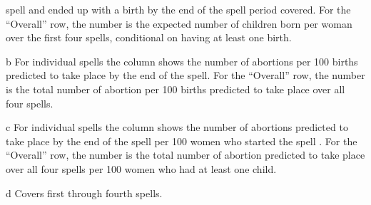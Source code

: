 \documentclass[12pt,letterpaper]{article}
\begin{document}
\begin{table}[htbp]
\begin{center}
\begin{scriptsize}
\begin{threeparttable}
\begin{tablenotes}
spell and ended up with a birth by the end of the spell period covered.
For the ``Overall'' row, the number is the expected number of children born per woman over 
the first four spells, conditional on having at least one birth.
\item[b] For individual spells the column shows the number of abortions per 100
births predicted to take place by the end of the spell.
For the ``Overall'' row, the number is the total number of abortion per 100 births 
predicted to take place over all four spells.
\item[c]  For individual spells the column shows the number of abortions 
predicted to take place by the end of the spell per 100 women who started the spell .
For the ``Overall'' row, the number is the total number of abortion 
predicted to take place over all four spells per 100 women who had at least one child.
\item[d] Covers first through fourth spells. 
\end{tablenotes}
\end{threeparttable}
\end{scriptsize}
\end{center}
\end{table}
\end{document}
